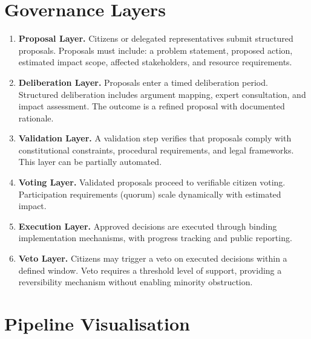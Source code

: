 \documentclass[12pt,a4paper,oneside]{report}
\begin{document}
\section{Governance Layers}

\begin{enumerate}
  \item \textbf{Proposal Layer.} Citizens or delegated representatives submit structured proposals. Proposals must include: a problem statement, proposed action, estimated impact scope, affected stakeholders, and resource requirements.

  \item \textbf{Deliberation Layer.} Proposals enter a timed deliberation period. Structured deliberation includes argument mapping, expert consultation, and impact assessment. The outcome is a refined proposal with documented rationale.

  \item \textbf{Validation Layer.} A validation step verifies that proposals comply with constitutional constraints, procedural requirements, and legal frameworks. This layer can be partially automated.

  \item \textbf{Voting Layer.} Validated proposals proceed to verifiable citizen voting. Participation requirements (quorum) scale dynamically with estimated impact.

  \item \textbf{Execution Layer.} Approved decisions are executed through binding implementation mechanisms, with progress tracking and public reporting.

  \item \textbf{Veto Layer.} Citizens may trigger a veto on executed decisions within a defined window. Veto requires a threshold level of support, providing a reversibility mechanism without enabling minority obstruction.
\end{enumerate}

\section{Pipeline Visualisation}

\begin{center}
\end{center}
\end{document}
